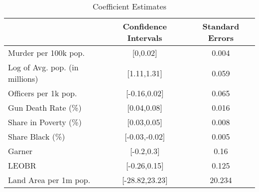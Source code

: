\begin{table}[ht]
\centering
\caption{Coefficient Estimates} \label{table:bootstrap_coefficients}
\begin{tabular}{lcc}
\hline \hline
& Confidence Intervals & Standard Errors \\ 
\hline
Murder per 100k pop. &[0,0.02]&0.004\\
Log of Avg. pop. (in millions) &[1.11,1.31]&0.059\\
Officers per 1k pop. &[-0.16,0.02]&0.065\\
Gun Death Rate (\%) &[0.04,0.08]&0.016\\
Share in Poverty (\%) &[0.03,0.05]&0.008\\
Share Black (\%) &[-0.03,-0.02]&0.005\\
Garner &[-0.2,0.3]&0.16\\
LEOBR &[-0.26,0.15]&0.125\\
Land Area per 1m pop. &[-28.82,23.23]&20.234\\
\hline \end{tabular} \end{table}